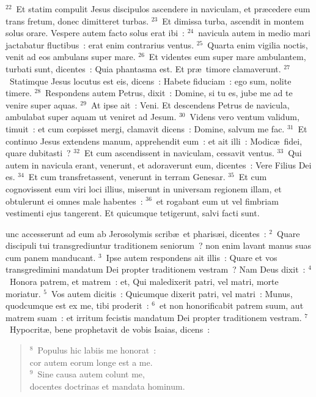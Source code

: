 ${}^{22}$~Et statim compulit Jesus discipulos ascendere in naviculam, et pr\ae cedere eum trans fretum, donec dimitteret turbas.
${}^{23}$~Et dimissa turba, ascendit in montem solus orare. Vespere autem facto solus erat ibi~:
${}^{24}$~navicula autem in medio mari jactabatur fluctibus~: erat enim contrarius ventus.
${}^{25}$~Quarta enim vigilia noctis, venit ad eos ambulans super mare.
${}^{26}$~Et videntes eum super mare ambulantem, turbati sunt, dicentes~: Quia phantasma est. Et pr\ae\ timore clamaverunt.
${}^{27}$~Statimque Jesus locutus est eis, dicens~: Habete fiduciam~: ego sum, nolite timere.
${}^{28}$~Respondens autem Petrus, dixit~: Domine, si tu es, jube me ad te venire super aquas.
${}^{29}$~At ipse ait~: Veni. Et descendens Petrus de navicula, ambulabat super aquam ut veniret ad Jesum.
${}^{30}$~Videns vero ventum validum, timuit~: et cum cœpisset mergi, clamavit dicens~: Domine, salvum me fac.
${}^{31}$~Et continuo Jesus extendens manum, apprehendit eum~: et ait illi~: Modic\ae\ fidei, quare dubitasti~?
${}^{32}$~Et cum ascendissent in naviculam, cessavit ventus.
${}^{33}$~Qui autem in navicula erant, venerunt, et adoraverunt eum, dicentes~: Vere Filius Dei es.
${}^{34}$~Et cum transfretassent, venerunt in terram Genesar.
${}^{35}$~Et cum cognovissent eum viri loci illius, miserunt in universam regionem illam, et obtulerunt ei omnes male habentes~:
${}^{36}$~et rogabant eum ut vel fimbriam vestimenti ejus tangerent. Et quicumque tetigerunt, salvi facti sunt.

\bchapter
{}unc accesserunt ad eum ab Jerosolymis scrib\ae\ et pharis\ae i, dicentes~:
${}^{2}$~Quare discipuli tui transgrediuntur traditionem seniorum~? non enim lavant manus suas cum panem manducant.
${}^{3}$~Ipse autem respondens ait illis~: Quare et vos transgredimini mandatum Dei propter traditionem vestram~? Nam Deus dixit~:
${}^{4}$~Honora patrem, et matrem~: et, Qui maledixerit patri, vel matri, morte moriatur.
${}^{5}$~Vos autem dicitis~: Quicumque dixerit patri, vel matri~: Munus, quodcumque est ex me, tibi proderit~:
${}^{6}$~et non honorificabit patrem suum, aut matrem suam~: et irritum fecistis mandatum Dei propter traditionem vestram.
${}^{7}$~Hypocrit\ae , bene prophetavit de vobis Isaias, dicens~:
\begin{verse}${}^{8}$~Populus hic labiis me honorat~:\\ cor autem eorum longe est a me.\\
${}^{9}$~Sine causa autem colunt me,\\ docentes doctrinas et mandata hominum.\end{verse}


